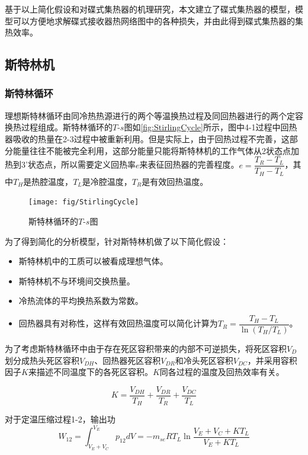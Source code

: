 基于以上简化假设和对碟式集热器的机理研究，本文建立了碟式集热器的模型，模型可以方便地求解碟式接收器热网络图中的各种损失，并由此得到碟式集热器的集热效率。

\subsection{斯特林机}
\label{sec:StirlingEngineModel}
\subsubsection{斯特林循环}
理想斯特林循环由同冷热热源进行的两个等温换热过程及同回热器进行的两个定容换热过程组成。斯特林循环的$T$-$s$图如\autoref{fig:StirlingCycle}所示，图中4-1过程中回热器吸收的热量在2-3过程中被重新利用。但是实际上，由于回热过程不完善，这部分能量往往不能被完全利用，这部分能量只能将斯特林机的工作气体从2状态点加热到3'状态点，所以需要定义回热率$e$来表征回热器的完善程度\cite{Formosa2010,Juhasz2010}。$e=\dfrac{T_R-T_L}{T_H-T_L}$，其中$T_H$是热腔温度，$T_L$是冷腔温度，$T_R$是有效回热温度。

\begin{figure}[htbp]
\centering
	\texttt{[image: fig/StirlingCycle]}
	\caption{斯特林循环的$T$-$s$图}
	\label{fig:StirlingCycle}
\end{figure}

为了得到简化的分析模型，针对斯特林机做了以下简化假设：

\begin{itemize}
\item 斯特林机中的工质可以被看成理想气体。
\item 斯特林机不与环境间交换热量。
\item 冷热流体的平均换热系数为常数。
\item 回热器具有对称性，这样有效回热温度可以简化计算为$T_{R}=\dfrac{T_{H}-T_{L}}{\ln(T_{H}/T_{L})}$\cite{Formosa2010,Juhasz2010}。
\end{itemize}

为了考虑斯特林循环中由于存在死区容积带来的内部不可逆损失，将死区容积$V_D$划分成热头死区容积$V_{DH}$、回热器死区容积$V_{DR}$和冷头死区容积$V_{DC}$\cite{Duan2014}，并采用容积因子$K$来描述不同温度下的各死区容积。$K$同各过程的温度及回热效率有关。

\begin{equation}
	K = \frac{V_{DH}}{T_H} + \frac{V_{DR}}{T_R} + \frac{V_{DC}}{T_L}
\end{equation}


对于定温压缩过程1-2，输出功
\begin{equation}
	W_{12} = \int^{V_E}_{V_E+V_C}{p_{12}dV}=-m_{se}RT_L\ln{\frac{V_E+V_C+KT_L}{V_E+KT_L}}
\end{equation}

